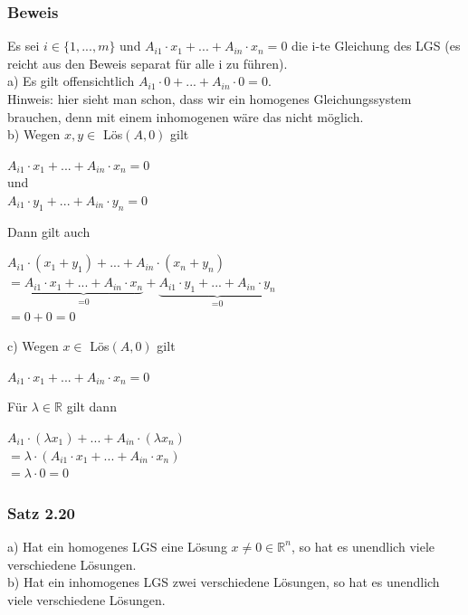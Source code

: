\documentclass{article}
\begin{document}
\subsubsection*{Beweis}
Es sei $i \in \{1, ..., m\}$ und $A_{i1}\cdot x_1 + ... + A_{in} \cdot x_n = 0$ die i-te Gleichung des LGS (es reicht aus den Beweis separat für alle i zu führen). \\
a) Es gilt offensichtlich $A_{i1} \cdot 0 + ... + A_{in} \cdot 0 = 0$. \\
Hinweis: hier sieht man schon, dass wir ein homogenes Gleichungssystem brauchen, denn mit einem inhomogenen wäre das nicht möglich. \\
b) Wegen $x,y \in$ Lös$(A,0)$ gilt 
\begin{center}
    $A_{i1} \cdot x_1 + ... + A_{in} \cdot x_n = 0$ \\
    und \\
    $A_{i1} \cdot y_1 + ... + A_{in} \cdot y_n = 0$
\end{center}
Dann gilt auch
\begin{center}
    $A_{i1} \cdot (x_1 + y_1) + ... + A_{in} \cdot (x_n + y_n)$ \\
    $= \underbrace{A_{i1} \cdot x_1 + ... + A_{in} \cdot x_n}_{\text{=0}} + \underbrace{A_{i1} \cdot y_1 + ... + A_{in} \cdot y_n}_{\text{=0}}$ \\   
    $= 0 + 0 = 0$
\end{center}
c) Wegen $x \in$ Lös$(A,0)$ gilt
\begin{center}
    $A_{i1} \cdot x_1 + ... + A_{in} \cdot x_n = 0$
\end{center}
Für $\lambda \in \mathbb{R}$ gilt dann
\begin{center}
    $A_{i1} \cdot (\lambda x_1) + ... + A_{in} \cdot (\lambda x_n)$ \\
    $= \lambda \cdot (A_{i1} \cdot x_1 + ... + A_{in} \cdot x_n)$ \\
    $= \lambda \cdot 0 = 0$
\end{center}

\subsubsection*{Satz 2.20}
a) Hat ein homogenes LGS eine Lösung $x \neq 0 \in \mathbb{R}^n$, so hat es unendlich viele verschiedene Lösungen. \\
b) Hat ein inhomogenes LGS zwei verschiedene Lösungen, so hat es unendlich viele verschiedene Lösungen. \\
\\
\end{document}
